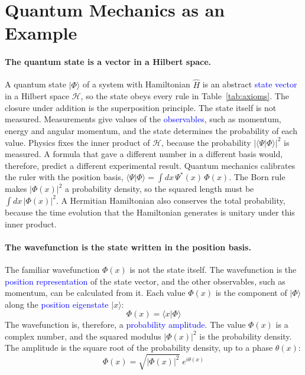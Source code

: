 \section{Quantum Mechanics as an Example}

\paragraph{The quantum state is a vector in a Hilbert space.} A quantum state $|\Phi\rangle$ of a system with Hamiltonian $\hat H$ is an abstract \textcolor{blue}{state vector} in a Hilbert space $\mathcal{H}$, so the state obeys every rule in Table~\ref{tab:axioms}. The closure under addition is the superposition principle. The state itself is not measured. Measurements give values of the \textcolor{blue}{observables}, such as momentum, energy and angular momentum, and the state determines the probability of each value. Physics fixes the inner product of $\mathcal{H}$, because the probability $|\langle \Psi | \Phi \rangle|^2$ is measured. A formula that gave a different number in a different basis would, therefore, predict a different experimental result. Quantum mechanics calibrates the ruler with the position basis, $\langle \Psi | \Phi \rangle = \int dx\, \Psi^{*}(x)\, \Phi(x)$. The Born rule makes $|\Phi(x)|^2$ a probability density, so the squared length must be $\int dx\, |\Phi(x)|^2$. A Hermitian Hamiltonian also conserves the total probability, because the time evolution that the Hamiltonian generates is unitary under this inner product.

\paragraph{The wavefunction is the state written in the position basis.} The familiar wavefunction $\Phi(x)$ is not the state itself. The wavefunction is the \textcolor{blue}{position representation} of the state vector, and the other observables, such as momentum, can be calculated from it. Each value $\Phi(x)$ is the component of $|\Phi\rangle$ along the \textcolor{blue}{position eigenstate} $|x\rangle$:
\begin{equation}
    \boxed{\Phi(x) = \langle x | \Phi \rangle}
\end{equation}
The wavefunction is, therefore, a \textcolor{blue}{probability amplitude}. The value $\Phi(x)$ is a complex number, and the squared modulus $|\Phi(x)|^2$ is the probability density. The amplitude is the square root of the probability density, up to a phase $\theta(x)$:
\begin{equation*}
    \Phi(x) = \sqrt{|\Phi(x)|^2}\; e^{i\theta(x)}
\end{equation*}

